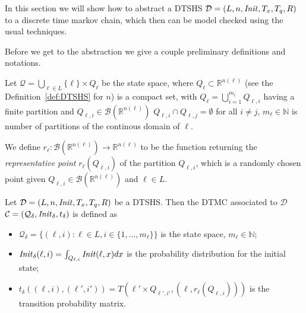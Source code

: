 In this section we will show how to abstract a DTSHS $\mathcal{D}=(L,n,\mathit{Init},T_x,T_q,R)$ to a discrete time markov chain, which then can be model checked using the usual techniques.

Before we get to the abstraction we give a couple preliminary definitions and notations.

\begin{defi}
Let $\mathcal{Q}=\bigcup_{\ell\in L}\{\ell\} \times Q_{\ell}$ be the state space, where $Q_{\ell}\subset \mathbb{R}^{n(\ell)}$ (see the Definition~\ref{def:DTSHS} for $n$) is a compact
set, with $Q_{\ell} = \bigcup_{i=1}^{m_{\ell}} Q_{\ell,i}$ having a finite partition and $Q_{\ell,i}\in \mathcal{B}(\mathbb{R}^{n(\ell)})$ $Q_{\ell,i}\cap Q_{\ell,j} = \emptyset$ for all
$i\neq j$, $m_{\ell}\in\mathbb{N}$ is number of partitions of the continous domain of $\ell$.
\end{defi}

\begin{defi}
We define $r_{\ell}:\mathcal{B}(\mathbb{R}^{n(\ell)})\rightarrow\mathbb{R}^{n(\ell)}$ to be the function returning the \emph{representative point} $r_{\ell}(Q_{\ell,i})$ of the partition $Q_{\ell,i}$, which is a randomly chosen point given
 $Q_{\ell,i}\in\mathcal{B}(\mathbb{R}^{n(\ell)})$ and $\ell\in L$.
\end{defi}


\begin{defi}
Let $\mathcal{D}=(L,n,\mathit{Init},T_x,T_q,R)$ be a DTSHS. Then the DTMC associated to $\mathcal{D}$ $\mathcal{C}=(\mathcal{Q}_{\delta},\mathit{Init}_{\delta},t_{\delta})$ is defined as
\begin{itemize}
    \item $\mathcal{Q}_{\delta}=\{(\ell,i) : \ell \in L, i\in\{1,\ldots,m_{\ell}\}\}$ is the state space, $m_{\ell}\in \mathbb{N}$;
    \item $\mathit{Init}_{\delta}(\ell,i) = \int_{Q_{\ell,i}} \mathit{Init}(\ell,x) dx$ is the probability distribution for the initial state;
    \item $t_{\delta}((\ell,i),(\ell',i')) = T(\ell'\times Q_{\ell',i'}, (\ell,r_{\ell}(Q_{\ell,i})))$ is the transition probability matrix.
\end{itemize}
\end{defi}

